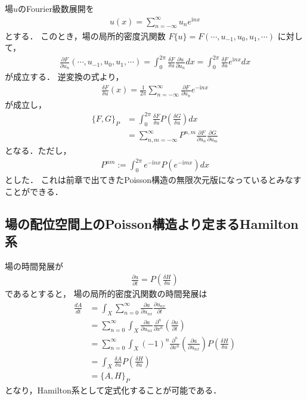 \documentclass[dvipdfmx,12pt,a4paper,uplatex]{jsarticle}
\theoremstyle{plain}
\theoremstyle{definition}
\begin{document}
場$u$のFourier級数展開を
\begin{align}
u(x) = \sum_{n=-\infty}^\infty u_n e^{\mathrm i nx}
\end{align}
とする．
このとき，場の局所的密度汎関数
$F\{u\}=F(\cdots,u_{-1},u_{0},u_1,\cdots)$
に対して，
\begin{align}
\frac{\partial F}{\partial u_n} (\cdots,u_{-1},u_{0},u_1,\cdots)
=
\int_0^{2\pi}
\frac{\delta F}{\delta u}\frac{\partial u}{\partial u_n}
dx 
=
\int_0^{2\pi}
\frac{\delta F}{\delta u} e^{\mathrm i nx}
dx
\end{align}
が成立する．
逆変換の式より，
\begin{align}
\frac{\delta F}{\delta u}(x)
= \frac{1}{2\pi}\sum_{n=-\infty}^\infty
\frac{\partial F}{\partial u_n} e^{-\mathrm i nx}
\end{align}
が成立し，
\begin{align}
\{F,G\}_P 
&= \int_0^{2\pi} \frac{\delta F}{\delta u} 
P\left(\frac{\delta G}{\delta u} \right) dx \nonumber\\
&=  \sum_{n,m=-\infty}^{\infty}
P^{n,m}
\frac{\partial F}{\partial u_n}
\frac{\partial G}{\partial u_m}
\end{align}
となる．ただし，
\begin{align}
P^{nm} 
:=
\int_0^{2\pi}
e^{-\mathrm i nx}
P\left( e^{-\mathrm i mx} \right) dx
\end{align}
とした．
これは前章で出てきたPoisson構造の無限次元版になっているとみなすことができる．

\subsection{場の配位空間上のPoisson構造より定まるHamilton系}
場の時間発展が
\begin{align}
\frac{\partial u}{\partial t} = P
\left(\frac{\delta H}{\delta u}\right)
\end{align}
であるとすると，
場の局所的密度汎関数の時間発展は
\begin{align}
\frac{dA}{dt} 
&= 
\int_X \sum_{n=0}^\infty \frac{\partial a}{\partial u_{nx}} 
\frac{\partial u_{nx}}{\partial t} \nonumber \\
&= 
\sum_{n=0}^\infty
\int_X  \frac{\partial a}{\partial u_{nx}} 
\frac{\partial^n}{\partial x^n}
\left(\frac{\partial u}{\partial t}\right)
\nonumber \\
&= 
\sum_{n=0}^\infty
\int_X (-1)^n\frac{\partial^n}{\partial x^n}
\left(\frac{\partial a}{\partial u_{nx}} \right)
P\left(\frac{\delta H}{\delta u} \right)
\nonumber \\
&=
\int_X \frac{\delta A}{\delta u} 
P\left(\frac{\delta H}{\delta u} \right) \nonumber \\
&=
\{A,H \}_P
\end{align}
となり，Hamilton系として定式化することが可能である．
\end{document}
